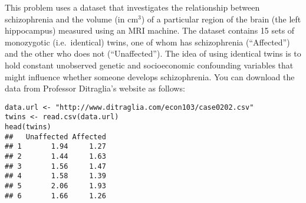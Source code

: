 \documentclass[addpoints,12pt]{exam}
\begin{document}
\begin{questions}

\question This problem uses a dataset that investigates the relationship between schizophrenia and the volume (in cm$^3$) of a particular region of the brain (the left hippocampus) measured using an MRI machine. The dataset contains 15 sets of monozygotic (i.e.\ identical) twins, one of whom has schizophrenia (``Affected'') and the other who does not (``Unaffected''). The idea of using identical twins is to hold constant unobserved genetic and socioeconomic confounding variables that might influence whether someone develops schizophrenia. You can download the data from Professor Ditraglia's website as follows:

\begin{verbatim}
data.url <- "http://www.ditraglia.com/econ103/case0202.csv"
twins <- read.csv(data.url)
head(twins)
##   Unaffected Affected
## 1       1.94     1.27
## 2       1.44     1.63
## 3       1.56     1.47
## 4       1.58     1.39
## 5       2.06     1.93
## 6       1.66     1.26
\end{verbatim}
\end{questions}
\end{document}

